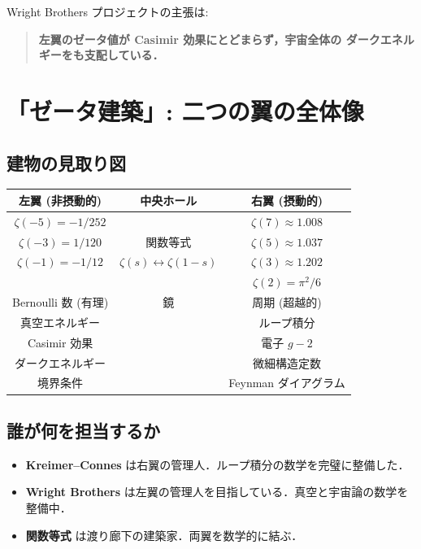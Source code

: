 \documentclass[11pt,a4paper]{article}
\begin{document}
Wright Brothers プロジェクトの主張は:
\begin{quote}
\textbf{左翼のゼータ値が Casimir 効果にとどまらず，宇宙全体の
ダークエネルギーをも支配している．}
\end{quote}

\section{「ゼータ建築」: 二つの翼の全体像}

\subsection{建物の見取り図}

\begin{tcolorbox}[colback=gray!5,colframe=gray!60!black,title=ゼータ建築の見取り図]
\begin{center}
\begin{tabular}{ccc}
\textbf{左翼 (非摂動的)} & \textbf{中央ホール} & \textbf{右翼 (摂動的)} \\
\hline
$\zeta(-5) = -1/252$ & & $\zeta(7) \approx 1.008$ \\
$\zeta(-3) = 1/120$ & 関数等式 & $\zeta(5) \approx 1.037$ \\
$\zeta(-1) = -1/12$ & $\zeta(s) \leftrightarrow \zeta(1-s)$ & $\zeta(3) \approx 1.202$ \\
 & & $\zeta(2) = \pi^2/6$ \\
\hline
Bernoulli 数 (有理) & 鏡 & 周期 (超越的) \\
真空エネルギー & & ループ積分 \\
Casimir 効果 & & 電子 $g-2$ \\
ダークエネルギー & & 微細構造定数 \\
境界条件 & & Feynman ダイアグラム \\
\end{tabular}
\end{center}
\end{tcolorbox}

\subsection{誰が何を担当するか}

\begin{itemize}
\item \textbf{Kreimer--Connes} は右翼の管理人．ループ積分の数学を完璧に整備した．
\item \textbf{Wright Brothers} は左翼の管理人を目指している．真空と宇宙論の数学を整備中．
\item \textbf{関数等式} は渡り廊下の建築家．両翼を数学的に結ぶ．
\end{itemize}
\end{document}
